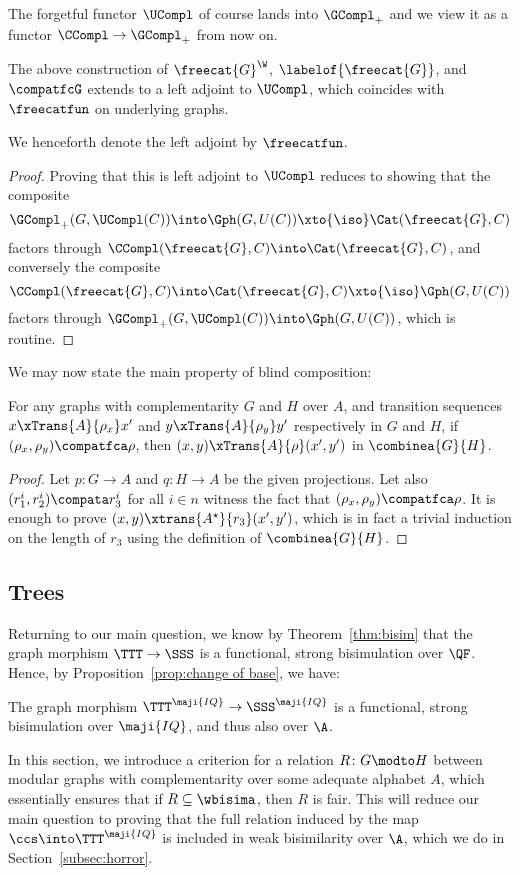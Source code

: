\documentclass{LMCS}
\renewcommand{\QFI}{\maji{IQ}}
\renewcommand{\LLL}{\QFI}
\renewcommand{\SSSL}{\SSS^{\LLL}}
\renewcommand{\TTTL}{\TTT^{\LLL}}
\theoremstyle{plain}\newtheorem{satz}[thm]{Satz}
\begin{document}
  The forgetful functor $\UCompl$ of course lands into $\GCompl_+$ and
  we view it as a functor $\CCompl \to \GCompl_+$ from now on.
  \begin{prop}
    The above construction of $\freecat{G}^\W$,
    $\labelof{\freecat{G}}$, and $\compatfcG$ extends to a left
    adjoint to $\UCompl$, which coincides with $\freecatfun$ on
    underlying graphs.
  \end{prop}
  We henceforth denote the left adjoint by $\freecatfun$. 
\begin{proof}
  Proving that this is left adjoint to $\UCompl$ reduces to showing
  that the composite
  $$\GCompl_+(G, \UCompl (C)) \into \Gph(G, U (C)) \xto{\iso} \Cat(\freecat{G},C)$$
  factors through $\CCompl(\freecat{G},C) \into \Cat(\freecat{G},C)$, and conversely the composite
  $$\CCompl(\freecat{G}, C) \into \Cat(\freecat{G},C) \xto{\iso} \Gph(G, U (C))$$
  factors through $\GCompl_+ (G, \UCompl (C)) \into \Gph(G, U (C))$,
  which is routine.
\end{proof}

We may now state the main property of blind composition:
\begin{prop}\label{prop:combinecombine}
  For any graphs with complementarity $G$ and $H$ over $A$, and
  transition sequences $x \xTrans{A}{\rho_x} x'$ and $y
  \xTrans{A}{\rho_y} y'$ respectively in $G$ and $H$, if
  $(\rho_x,\rho_y) \compatfca \rho$, then $(x,y) \xTrans{A}{\rho}
  (x',y')$ in $\combinea{G}{H}$.
\end{prop}
\begin{proof}
  Let $p \colon G \to A$ and $q \colon H \to A$ be the given
  projections. Let also $(r^i_1,r^i_2) \compata r^i_3$ for
  all $i \in n$ witness the fact that $(\rho_x,\rho_y) \compatfca
  \rho$.  It is enough to prove $(x,y)
  \xtrans{A^\star}{r_3} (x',y')$, which is in fact a
  trivial induction on the length of $r_3$ using the definition of
  $\combinea{G}{H}$.
\end{proof}


\subsection{Trees}
Returning to our main question, we know by Theorem~\ref{thm:bisim}
that the graph morphism $\TTT \to \SSS$ is a functional, strong
bisimulation over $\QF$. Hence, by Proposition~\ref{prop:change of
  base}, we have:
\begin{prop}\label{prop:strongbisima}
  The graph morphism $\TTTL \to \SSSL$ is a functional, strong
  bisimulation over $\LLL$, and thus also over $\A$.
\end{prop}
In this section, we introduce a criterion for a relation $R \colon G
\modto H$ between modular graphs with complementarity over some
adequate alphabet $A$, which essentially ensures that if $R \subseteq
\wbisima$, then $R$ is fair.  This will reduce our main question to
proving that the full relation induced by the map $\ccs \into \TTTL$
is included in weak bisimilarity over $\A$, which we do in
Section~\ref{subsec:horror}.
\end{document}
